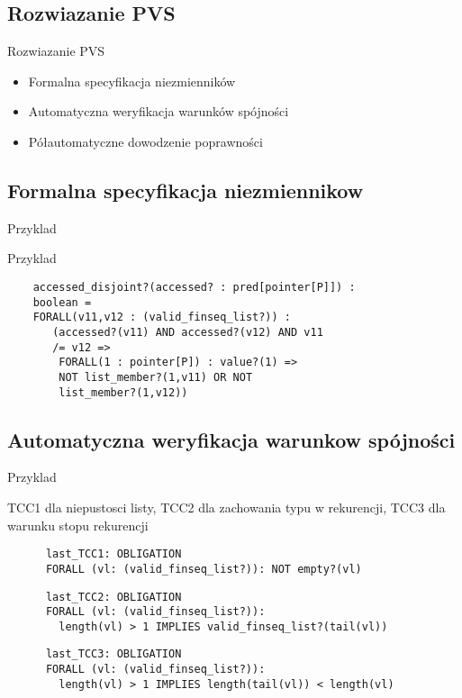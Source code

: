 \documentclass{beamer}
\begin{document}
\subsection{Rozwiazanie PVS}
\begin{frame}{Rozwiazanie PVS}

    \begin{itemize}
      \item Formalna specyfikacja niezmienników
      \item Automatyczna weryfikacja warunków spójności
      \item Półautomatyczne dowodzenie poprawności
    \end{itemize}
\end{frame}

\subsection{Formalna specyfikacja niezmiennikow}
\begin{frame}[fragile]{Przyklad}
  \begin{exampleblock}{Przyklad}
    
  \begin{verbatim}
    accessed_disjoint?(accessed? : pred[pointer[P]]) : 
    boolean =
    FORALL(v11,v12 : (valid_finseq_list?)) :
       (accessed?(v11) AND accessed?(v12) AND v11 
       /= v12 =>
        FORALL(1 : pointer[P]) : value?(1) =>
        NOT list_member?(1,v11) OR NOT 
        list_member?(1,v12))
    \end{verbatim}
  \end{exampleblock}

\end{frame}

\subsection{Automatyczna weryfikacja warunkow spójności}

\begin{frame}[fragile]{Przyklad}
  \begin{exampleblock}{TCC1 dla niepustosci listy, TCC2 dla zachowania typu w rekurencji, TCC3 dla warunku stopu rekurencji}
 
    \begin{verbatim}
      last_TCC1: OBLIGATION 
      FORALL (vl: (valid_finseq_list?)): NOT empty?(vl)
    \end{verbatim}

    \begin{verbatim}
      last_TCC2: OBLIGATION 
      FORALL (vl: (valid_finseq_list?)): 
        length(vl) > 1 IMPLIES valid_finseq_list?(tail(vl))
    \end{verbatim}

    \begin{verbatim}
      last_TCC3: OBLIGATION 
      FORALL (vl: (valid_finseq_list?)): 
        length(vl) > 1 IMPLIES length(tail(vl)) < length(vl)
    \end{verbatim}
  \end{exampleblock}
    
\end{frame}
\end{document}
